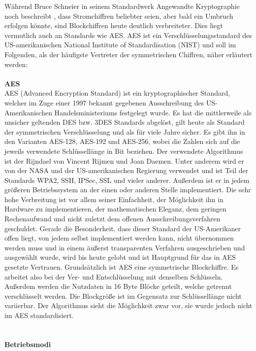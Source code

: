 \documentclass[13pt,a4paper,bibliography=totocnumbered,listof=totocnumbered]{scrartcl}
\begin{document}
Während Bruce Schneier in seinem Standardwerk Angewandte Kryptographie noch beschreibt \cite[S. 249]{42}, dass Stromchiffren beliebter seien, aber bald ein Umbruch erfolgen könnte, sind Blockchiffren heute deutlich verbreiteter. Dies liegt vermutlich auch an Standards wie AES. AES ist ein Verschlüsselungsstandard des US-amerikanischen National Institute of Standardisation (NIST) und soll im Folgenden, als der häufigste Vertreter der symmetrischen Chiffren, näher erläutert werden:\\
\\\textbf{AES}\\
AES (Advanced Encryption Standard) ist ein kryptographischer Standard, welcher im Zuge einer 1997 bekannt gegebenen Ausschreibung des US-Amerikanischen Handelsministeriums festgelegt wurde. Es hat die mittlerweile als unsicher geltenden DES bzw. 3DES Standards abgelöst, gilt heute als Standard der symmetrischen Verschlüsselung und als für viele Jahre sicher. Es gibt ihn in den Varianten AES-128, AES-192 und AES-256, wobei die Zahlen sich auf die jeweils verwendete Schlüssellänge in Bit beziehen. Der verwendete Algorithmus ist der Rijndael von Vincent Rijmen und Joan Daemen. Unter anderem wird er von der NASA und der US-amerikanischen Regierung verwendet und ist Teil der Standards WPA2, SSH, IPSec, SSL und vieler anderer. Außerdem ist er in jedem größeren Betriebssystem an der einen oder anderen Stelle implementiert. Die sehr hohe Verbreitung ist vor allem seiner Einfachheit, der Möglichkeit ihn in Hardware zu implementieren, der mathematischen Eleganz, dem geringen Rechenaufwand und nicht zuletzt dem offenen Ausschreibungsverfahren geschuldet. Gerade die Besonderheit, dass dieser Standard der US-Amerikaner offen liegt, von jedem selbst implementiert werden kann, nicht übernommen werden muss und in einem äußerst transparenten Verfahren ausgeschrieben und ausgewählt wurde, wird bis heute gelobt und ist Hauptgrund für das in AES gesetzte Vertrauen. Grundsätzlich ist AES eine symmetrische Blockchiffre. Es arbeitet also bei der Ver- und Entschlüsselung mit denselben Schlüsseln. Außerdem werden die Nutzdaten in 16 Byte Blöcke geteilt, welche getrennt verschlüsselt werden. Die Blockgröße ist im Gegensatz zur Schlüssellänge nicht variierbar. Der Algorithmus sieht die Möglichkeit zwar vor, sie wurde jedoch nicht im AES standardisiert.\\
\cite{5} \cite[S. 7ff]{4}\\
\\\textbf{Betriebsmodi}\\
\end{document}
